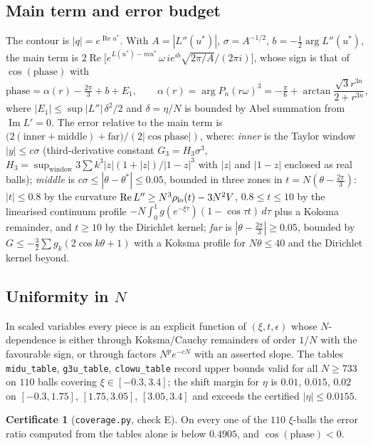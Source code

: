 \documentclass[11pt,reqno]{amsart}
\theoremstyle{plain}
\theoremstyle{definition}
\newtheorem{certificate}[theorem]{Certificate}
\renewcommand{\Re}{\operatorname{Re}}
\renewcommand{\Im}{\operatorname{Im}}
\begin{document}
\subsection{Main term and error budget}
The contour is $|q|=e^{\Re u^*}$. With $A=|L''(u^*)|$, $\sigma=A^{-1/2}$, $b=-\frac12\arg L''(u^*)$, the main term is
$2\Re\bigl[e^{L(u^*)-mu^*}\,\omega\,ie^{ib}\sqrt{2\pi/A}/(2\pi i)\bigr]$, whose sign is that of $\cos(\text{phase})$ with
\[
\text{phase}=\alpha(r)-\tfrac{2\pi}3+b+E_1,\qquad \alpha(r)=\arg P_n(r\omega)^3=-\tfrac\pi6+\arctan\frac{\sqrt3r^{3n}}{2+r^{3n}},
\]
where $|E_1|\le\sup|L''|\,\delta^2/2$ and $\delta=\eta/N$ is bounded by Abel summation from $\Im L'=0$. The error relative to the main term is
$\bigl(2(\text{inner}+\text{middle})+\text{far}\bigr)/(2|\cos\text{phase}|)$, where: \emph{inner} is the Taylor window $|y|\le c\sigma$
(third-derivative constant $G_3=H_3\sigma^3$, $H_3=\sup_{\text{window}}3\sum k^3|z|(1+|z|)/|1-z|^3$ with $|z|$ and $|1-z|$ enclosed as real balls);
\emph{middle} is $c\sigma\le|\theta-\theta^*|\le0.05$, bounded in three zones in $t=N(\theta-\frac{2\pi}3)$: $|t|\le0.8$ by the curvature
$\Re L''\ge N^3\rho_{\rm lo}(t)-3N^2V$, $0.8\le t\le10$ by the linearised continuum profile $-N\int_0^1g(e^{-\xi\tau})(1-\cos\tau t)\,d\tau$ plus a
Koksma remainder, and $t\ge10$ by the Dirichlet kernel; \emph{far} is $|\theta-\frac{2\pi}3|\ge0.05$, bounded by
$G\le-\frac32\sum g_k(2\cos k\theta+1)$ with a Koksma profile for $N\theta\le40$ and the Dirichlet kernel beyond.

\subsection{Uniformity in $N$}
In scaled variables every piece is an explicit function of $(\xi,t,\epsilon)$ whose $N$-dependence is either through
Koksma/Cauchy remainders of order $1/N$ with the favourable sign, or through factors $N^pe^{-cN}$ with an asserted slope. The tables
\texttt{midu\_table}, \texttt{g3u\_table}, \texttt{clowu\_table} record upper bounds valid for all $N\ge733$ on $110$ balls covering
$\xi\in[-0.3,3.4]$; the shift margin for $\eta$ is $0.01$, $0.015$, $0.02$ on $[-0.3,1.75]$, $[1.75,3.05]$, $[3.05,3.4]$ and exceeds the certified
$|\eta|\le0.0155$.

\begin{certificate}[\texttt{coverage.py}, check E]\label{cert:centre}
On every one of the $110$ $\xi$-balls the error ratio computed from the tables alone is below $0.4905$, and $\cos(\text{phase})<0$.
\end{certificate}
\end{document}
